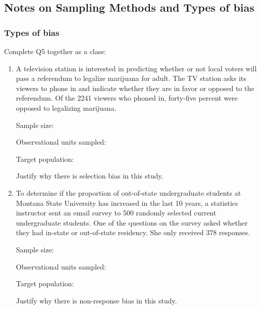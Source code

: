\documentclass[
]{report}
\begin{document}
\vspace{2.5in}

\subsection*{Notes on Sampling Methods and Types of bias}\label{notes-on-sampling-methods-and-types-of-bias}

\vspace{5in}

\newpage

\subsubsection*{Types of bias}\label{types-of-bias}

Complete Q5 together as a class:

\begin{enumerate}
\def\labelenumi{\arabic{enumi}.}
\setcounter{enumi}{4}
\item
  A television station is interested in predicting whether or not local voters will pass a referendum to legalize marijuana for adult. The TV station asks its viewers to phone in and indicate whether they are in favor or opposed to the referendum. Of the 2241 viewers who phoned in, forty-five percent were opposed to legalizing marijuana.
  \vspace{0.1in}

  Sample size:
  \vspace{0.3in}

  Observational units sampled:
  \vspace{0.3in}

  Target population:
  \vspace{0.3in}

  Justify why there is selection bias in this study.
  \vspace{0.5in}
\item
  To determine if the proportion of out-of-state undergraduate students at Montana State University has increased in the last 10 years, a statistics instructor sent an email survey to 500 randomly selected current undergraduate students. One of the questions on the survey asked whether they had in-state or out-of-state residency. She only received 378 responses.
  \vspace{0.1in}

  Sample size:
  \vspace{0.3in}

  Observational units sampled:
  \vspace{0.3in}

  Target population:
  \vspace{0.3in}

  Justify why there is non-response bias in this study.
  \vspace{0.5in}
\end{enumerate}
\end{document}

